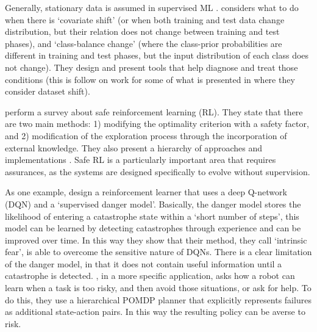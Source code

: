     Generally, stationary data is assumed in supervised ML . \citet{Sugiyama2013-ci} considers what to do when there is `covariate shift' (or when both training and test data change distribution, but their relation does not change between training and test phases), and `class-balance change' (where the class-prior probabilities are different in training and test phases, but the input distribution of each class does not change). They design and present tools that help diagnose and treat those conditions (this is follow on work for some of what is presented in \citet{Quinonero-Candela2009-fj} where they consider dataset shift). 

    \citet{Garcia2015-rs} perform a survey about safe reinforcement learning (RL).  They state that there are two main methods: 1) modifying the optimality criterion with a safety factor, and 2) modification of the exploration process through the incorporation of external knowledge. They also present a hierarchy of approaches and implementations . 
Safe RL is a particularly important area that requires assurances, as the systems are designed specifically to evolve without supervision.

    As one example, \citet{Lipton2016-dq} design a reinforcement learner that uses a deep Q-network (DQN) and a `supervised danger model'. Basically, the danger model stores the likelihood of entering a catastrophe state within a `short number of steps', this model can be learned by detecting catastrophes through experience and can be improved over time.  In this way they show that their method, they call `intrinsic fear', is able to overcome the sensitive nature of DQNs. There is a clear limitation of the danger model, in that it does not contain useful information until a catastrophe is detected.  
\citet{Curran2016-ij}, in a more specific application, asks how a robot can learn when a task is too risky, and then avoid those situations, or ask for help. To do this, they use a hierarchical POMDP planner that explicitly represents failures as additional state-action pairs. In this way the resulting policy can be averse to risk. 
    

